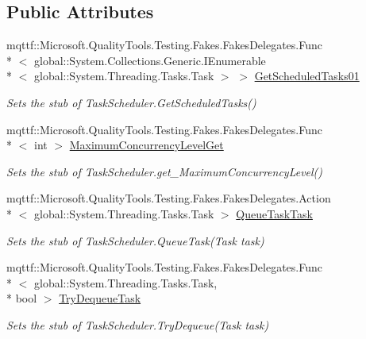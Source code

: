 \subsection*{Public Attributes}
\begin{DoxyCompactItemize}
\item 
mqttf\-::\-Microsoft.\-Quality\-Tools.\-Testing.\-Fakes.\-Fakes\-Delegates.\-Func\\*
$<$ global\-::\-System.\-Collections.\-Generic.\-I\-Enumerable\\*
$<$ global\-::\-System.\-Threading.\-Tasks.\-Task $>$ $>$ \hyperlink{class_system_1_1_threading_1_1_tasks_1_1_fakes_1_1_stub_task_scheduler_a2fe35dd849e32e5c6f9b900d1e4fc9b8}{Get\-Scheduled\-Tasks01}
\begin{DoxyCompactList}\small\item\em Sets the stub of Task\-Scheduler.\-Get\-Scheduled\-Tasks()\end{DoxyCompactList}\item 
mqttf\-::\-Microsoft.\-Quality\-Tools.\-Testing.\-Fakes.\-Fakes\-Delegates.\-Func\\*
$<$ int $>$ \hyperlink{class_system_1_1_threading_1_1_tasks_1_1_fakes_1_1_stub_task_scheduler_aa2d1d323292e73e45cc57ee0fa9d1c05}{Maximum\-Concurrency\-Level\-Get}
\begin{DoxyCompactList}\small\item\em Sets the stub of Task\-Scheduler.\-get\-\_\-\-Maximum\-Concurrency\-Level()\end{DoxyCompactList}\item 
mqttf\-::\-Microsoft.\-Quality\-Tools.\-Testing.\-Fakes.\-Fakes\-Delegates.\-Action\\*
$<$ global\-::\-System.\-Threading.\-Tasks.\-Task $>$ \hyperlink{class_system_1_1_threading_1_1_tasks_1_1_fakes_1_1_stub_task_scheduler_a0066d6709fa645a32120e1fca61a2f5e}{Queue\-Task\-Task}
\begin{DoxyCompactList}\small\item\em Sets the stub of Task\-Scheduler.\-Queue\-Task(\-Task task)\end{DoxyCompactList}\item 
mqttf\-::\-Microsoft.\-Quality\-Tools.\-Testing.\-Fakes.\-Fakes\-Delegates.\-Func\\*
$<$ global\-::\-System.\-Threading.\-Tasks.\-Task, \\*
bool $>$ \hyperlink{class_system_1_1_threading_1_1_tasks_1_1_fakes_1_1_stub_task_scheduler_a1718f01bf72ecb9107d3660373186a7a}{Try\-Dequeue\-Task}
\begin{DoxyCompactList}\small\item\em Sets the stub of Task\-Scheduler.\-Try\-Dequeue(\-Task task)\end{DoxyCompactList}\item 

\end{DoxyCompactItemize}
